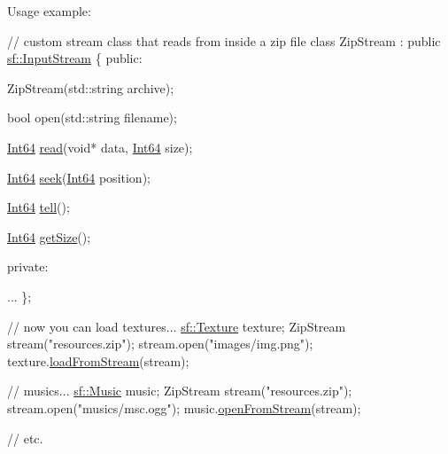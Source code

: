 Usage example\-: 
\begin{DoxyCode}
\textcolor{comment}{// custom stream class that reads from inside a zip file}
\textcolor{keyword}{class }ZipStream : \textcolor{keyword}{public} \hyperlink{classsf_1_1_input_stream}{sf::InputStream}
\{
\textcolor{keyword}{public}:

    ZipStream(std::string archive);

    \textcolor{keywordtype}{bool} open(std::string filename);

    \hyperlink{namespacesf_a2840579fed3494d9f330baf7a5a19903}{Int64} \hyperlink{classsf_1_1_input_stream_a8dd89c74c1acb693203f50e750c6ae53}{read}(\textcolor{keywordtype}{void}* data, \hyperlink{namespacesf_a2840579fed3494d9f330baf7a5a19903}{Int64} size);

    \hyperlink{namespacesf_a2840579fed3494d9f330baf7a5a19903}{Int64} \hyperlink{classsf_1_1_input_stream_a76aba8e5d5cf9b1c5902d5e04f7864fc}{seek}(\hyperlink{namespacesf_a2840579fed3494d9f330baf7a5a19903}{Int64} position);

    \hyperlink{namespacesf_a2840579fed3494d9f330baf7a5a19903}{Int64} \hyperlink{classsf_1_1_input_stream_a599515b9ccdbddb6fef5a98424fd559c}{tell}();

    \hyperlink{namespacesf_a2840579fed3494d9f330baf7a5a19903}{Int64} \hyperlink{classsf_1_1_input_stream_a311eaaaa65d636728e5153b574b72d5d}{getSize}();

\textcolor{keyword}{private}:

    ...
\};

\textcolor{comment}{// now you can load textures...}
\hyperlink{classsf_1_1_texture}{sf::Texture} texture;
ZipStream stream(\textcolor{stringliteral}{"resources.zip"});
stream.open(\textcolor{stringliteral}{"images/img.png"});
texture.\hyperlink{classsf_1_1_texture_a6803a13465a7113a8964d1081841886d}{loadFromStream}(stream);

\textcolor{comment}{// musics...}
\hyperlink{classsf_1_1_music}{sf::Music} music;
ZipStream stream(\textcolor{stringliteral}{"resources.zip"});
stream.open(\textcolor{stringliteral}{"musics/msc.ogg"});
music.\hyperlink{classsf_1_1_music_a4e55d1910a26858b44778c26b237d673}{openFromStream}(stream);

\textcolor{comment}{// etc.}
\end{DoxyCode}
 

